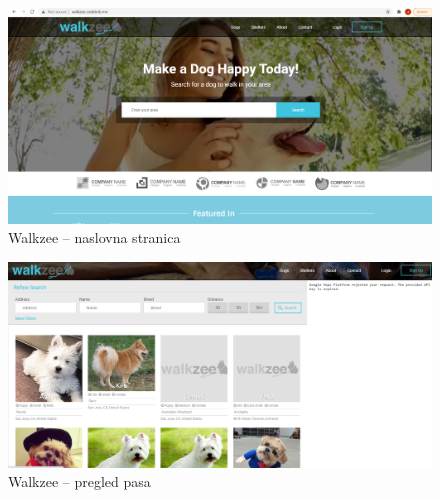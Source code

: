 		\begin{figure}[htb]
			\centering
			\includegraphics[scale=0.3]{slike/walkzee.png}
			\caption{Walkzee -- naslovna stranica}
			\label{fig:walkzee}
		\end{figure}

		
		\begin{figure}[htb]
			\centering
			\includegraphics[scale=0.3]{slike/walkzeeDogs.png}
			\caption{Walkzee -- pregled pasa}
			\label{fig:walkzee}
		\end{figure}
	
